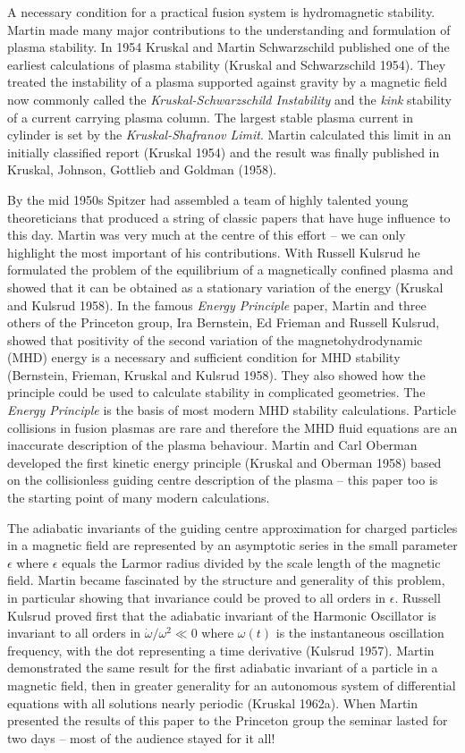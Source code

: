 \documentclass[11pt]{article}
\begin{document}
A necessary condition for a practical fusion system is hydromagnetic stability.  Martin made many major contributions to the understanding and formulation of plasma stability.  In 1954 Kruskal and Martin Schwarzschild published one of the earliest calculations of plasma stability (Kruskal and Schwarzschild 1954). They treated the instability of a plasma supported against gravity by a magnetic field now commonly called the \textit{Kruskal-Schwarzschild Instability} and the \textit{kink} stability of a current carrying plasma column.  The largest stable plasma current in cylinder is set by the \textit{Kruskal-Shafranov Limit}. Martin calculated this limit in an initially classified report (Kruskal 1954) and the result was finally published in Kruskal, Johnson, Gottlieb and Goldman (1958). 

By the mid 1950s Spitzer had assembled a team of highly talented young theoreticians that produced a string of classic papers that have huge influence to this day.  Martin was very much at the centre of this effort -- we can only highlight the most important of his contributions.  With Russell Kulsrud he formulated the problem of the equilibrium of a magnetically confined plasma and showed that it can be obtained as a stationary variation of the energy (Kruskal and Kulsrud 1958).  In the famous \textit{Energy Principle} paper, Martin and three others of the Princeton group, Ira Bernstein, Ed Frieman and Russell Kulsrud, showed that positivity of the second variation of the magnetohydrodynamic (MHD) energy is a necessary and sufficient condition for MHD stability (Bernstein, Frieman, Kruskal and Kulsrud 1958).  They also showed how the principle could be used to calculate stability in complicated geometries.  The \textit{Energy Principle} is the basis of most modern MHD stability calculations.  Particle collisions in fusion plasmas are rare and therefore the MHD fluid equations are an inaccurate description of the plasma behaviour.   Martin and Carl Oberman developed the first kinetic energy principle (Kruskal and Oberman 1958) based on the collisionless guiding centre description of the plasma -- this paper too is the starting point of many modern calculations.
    
The adiabatic invariants of the guiding centre approximation for charged particles in a magnetic field are represented by an asymptotic series in the small parameter $\epsilon$ where $\epsilon$ equals the Larmor radius divided by the scale length of the magnetic field.  Martin became fascinated by the structure and generality of this problem, in particular showing that invariance could be proved to all orders in $\epsilon$.  Russell Kulsrud proved first that the adiabatic invariant of the Harmonic Oscillator is invariant to all orders in ${\dot\omega}/\omega^{2}\ll 0$ where $\omega(t)$ is the instantaneous oscillation frequency, with the dot representing a time derivative (Kulsrud 1957). Martin demonstrated the same result for the first adiabatic invariant of a particle in a magnetic field, then in greater generality for an autonomous system of differential equations with all solutions nearly periodic (Kruskal 1962a).  When Martin presented the results of this paper to the Princeton group the seminar lasted for two days -- most of the audience stayed for it all!   
\end{document}
